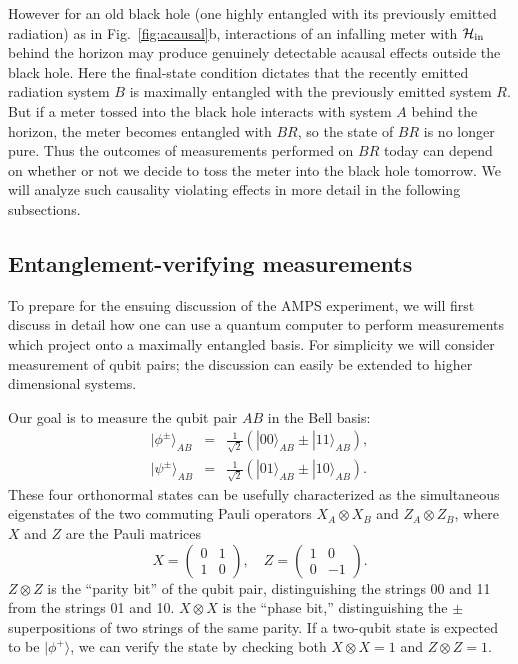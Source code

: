 \documentclass[11pt]{article}
\begin{document}
However for an old black hole (one highly entangled with its previously emitted radiation) as in Fig.~\ref{fig:acausal}b, interactions of an infalling meter with $\mathcal{H}_{\rm in}$ behind the horizon may produce genuinely detectable acausal effects outside the black hole. Here the final-state condition dictates that the recently emitted radiation system $B$ is maximally entangled with the previously emitted system $R$. But if a meter tossed into the black hole interacts with system $A$ behind the horizon, the meter becomes entangled with $BR$, so the state of $BR$ is no longer pure. Thus the outcomes of measurements performed on $BR$ today can depend on whether or not we decide to toss the meter into the black hole tomorrow. We will analyze such causality violating effects in more detail in the following subsections. 


\subsection{Entanglement-verifying measurements}

To prepare for the ensuing discussion of the AMPS experiment, we will first discuss in detail how one can use a quantum computer to perform measurements which project onto a maximally entangled basis. For simplicity we will consider measurement of qubit pairs; the discussion can easily be extended to higher dimensional systems. 

Our goal is to measure the qubit pair $AB$ in the Bell basis:
\begin{eqnarray}
|\phi^\pm\rangle_{AB} &=&\frac{1}{\sqrt{2}}\left(|00\rangle_{AB} \pm |11\rangle_{AB}\right),\nonumber\\
|\psi^\pm\rangle_{AB} &=&\frac{1}{\sqrt{2}}\left(|01\rangle_{AB} \pm |10\rangle_{AB}\right).
\end{eqnarray}
These four orthonormal states can be usefully characterized as the simultaneous eigenstates of the two commuting Pauli operators $X_A\otimes X_B$ and $Z_A\otimes Z_B$, where $X$ and $Z$ are the Pauli matrices
\begin{equation}
X = \left( \begin{array}{cc}
0 & 1  \\
1 & 0 \end{array} \right) ,\quad 
Z = \left( \begin{array}{cc}
1 & 0  \\
0 & -1 \end{array} \right).
\end{equation}
$Z\otimes Z$ is the ``parity bit'' of the qubit pair, distinguishing the strings 00 and 11 from the strings 01 and 10. $X\otimes X$ is the ``phase bit,'' distinguishing the $\pm$ superpositions of two strings of the same parity. If a two-qubit state is expected to be $|\phi^+\rangle$, we can verify the state by checking both $X\otimes X = 1$ and $Z\otimes Z=1$. 
\end{document}

